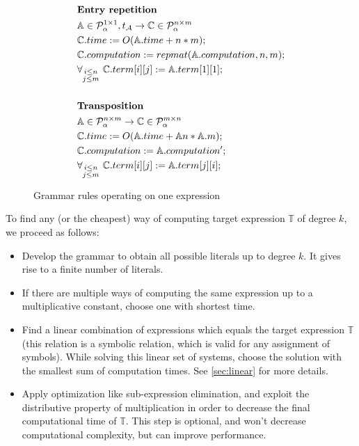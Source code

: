 \begin{figure}
\begin{framed}
\begin{align*}
& \\
&\text{{\bf Entry repetition}}\\
&\mathbb{A} \in \mathcal{P}^{1 \times 1}_\alpha, t_\mathcal{A} \rightarrow \mathbb{C} \in \mathcal{P}^{n \times m}_\alpha \\
&\mathbb{C}.time := O(\mathbb{A}.time + n * m);\\
&\mathbb{C}.computation := repmat(\mathbb{A}.computation, n, m); \\
&\forall_{\substack{i \leq n\\ j \leq m}}\text{ } \mathbb{C}.term[i][j] := \mathbb{A}.term[1][1];\\
& \\
&\text{{\bf Transposition}}\\
&\mathbb{A} \in \mathcal{P}^{n \times m}_\alpha \rightarrow \mathbb{C} \in \mathcal{P}^{m \times n}_\alpha\\
&\mathbb{C}.time := O(\mathbb{A}.time + \mathbb{A}n * \mathbb{A}.m);\\
&\mathbb{C}.computation := \mathbb{A}.computation';\\
&\forall_{\substack{i \leq n\\j \leq m}}\text{ } \mathbb{C}.term[i][j] := \mathbb{A}.term[j][i];
\end{align*}
\caption{Grammar rules operating on one expression}
\label{fig:rules}
\end{framed}
\end{figure}


To find any (or the cheapest) way of computing target expression $\mathbb{T}$ of degree $k$, we proceed as follows: 
\begin{itemize}
\item Develop the grammar to obtain all possible literals up to degree
  $k$. It gives rise to a finite number of literals. 
\item If there are multiple ways of computing the same expression up
  to a multiplicative constant, choose one with shortest time.
\item Find a linear combination of expressions which equals the target
  expression $\mathbb{T}$ (this relation is a symbolic relation, which
  is valid for any assignment of symbols). While solving this linear
  set of systems, choose the solution with the smallest sum of computation
  times. See \ref{sec:linear} for more details.
\item Apply optimization like sub-expression elimination, and exploit
  the distributive property of multiplication in order to decrease the
  final computational time of $\mathbb{T}$. This step is optional, and
  won't decrease computational complexity, but can improve
  performance.
\end{itemize}

